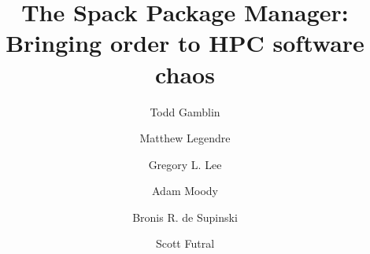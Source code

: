 \documentclass{sig-alternate}
\begin{document}
\title{The Spack Package Manager:\\
Bringing order to HPC software chaos}
\author{
\alignauthor Todd Gamblin\\
\and
\alignauthor Matthew Legendre\\
\and
\alignauthor Gregory L. Lee\\
\and
\alignauthor Adam Moody\\
\and
\alignauthor Bronis R. de Supinski\\
\and
\alignauthor Scott Futral\\
\and\\
%
}
\maketitle

\begin{abstract}
	
\end{abstract}











\end{document}
